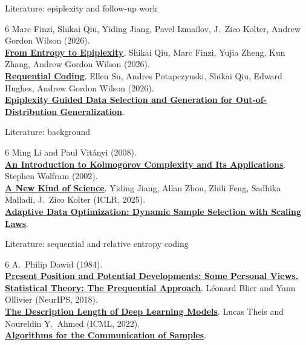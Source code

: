 \documentclass[aspectratio=169,notheorems]{beamer}
\theoremstyle{definition}
\begin{document}
\begin{frame}[t]{Literature: epiplexity and follow-up work}
\begin{thebibliography}{6}\setlength{\itemsep}{0.55em}
\normalsize
{}
Marc Finzi, Shikai Qiu, Yiding Jiang, Pavel Izmailov, J.~Zico Kolter, Andrew Gordon Wilson (2026).\\
\href{https://arxiv.org/abs/2601.03220v2}{\color{myblue}\textbf{From Entropy to Epiplexity}}.
Shikai Qiu, Marc Finzi, Yujia Zheng, Kun Zhang, Andrew Gordon Wilson (2026).\\
\href{https://arxiv.org/abs/2607.11883}{\color{myblue}\textbf{Requential Coding}}.
Ellen Su, Andres Potapczynski, Shikai Qiu, Edward Hughes, Andrew Gordon Wilson (2026).\\
\href{https://arxiv.org/abs/2608.11746}{\color{myblue}\textbf{Epiplexity Guided Data Selection and Generation for Out-of-Distribution Generalization}}.
\end{thebibliography}
\end{frame}
\begin{frame}[t]{Literature: background}
\begin{thebibliography}{6}\setlength{\itemsep}{0.7em}
\normalsize
{}
Ming Li and Paul Vit\'anyi (2008).\\
\href{https://doi.org/10.1007/978-0-387-49820-1}{\color{myblue}\textbf{An Introduction to Kolmogorov Complexity and Its Applications}}.
Stephen Wolfram (2002).\\
\href{https://www.wolframscience.com/nks/}{\color{myblue}\textbf{A New Kind of Science}}.
Yiding Jiang, Allan Zhou, Zhili Feng, Sadhika Malladi, J.~Zico Kolter (ICLR, 2025).\\
\href{https://arxiv.org/abs/2410.11820}{\color{myblue}\textbf{Adaptive Data Optimization: Dynamic Sample Selection with Scaling Laws}}.
\end{thebibliography}
\end{frame}
\begin{frame}[t]{Literature: sequential and relative entropy coding}
\begin{thebibliography}{6}\setlength{\itemsep}{0.7em}
\normalsize
{}
A.~Philip Dawid (1984).\\
\href{https://doi.org/10.2307/2981683}{\color{myblue}\textbf{Present Position and Potential Developments: Some Personal Views. Statistical Theory: The Prequential Approach}}.
L\'eonard Blier and Yann Ollivier (NeurIPS, 2018).\\
\href{https://arxiv.org/abs/1802.07044}{\color{myblue}\textbf{The Description Length of Deep Learning Models}}.
Lucas Theis and Noureldin Y.~Ahmed (ICML, 2022).\\
\href{https://proceedings.mlr.press/v162/theis22a.html}{\color{myblue}\textbf{Algorithms for the Communication of Samples}}.
\end{thebibliography}
\end{frame}
\end{document}
